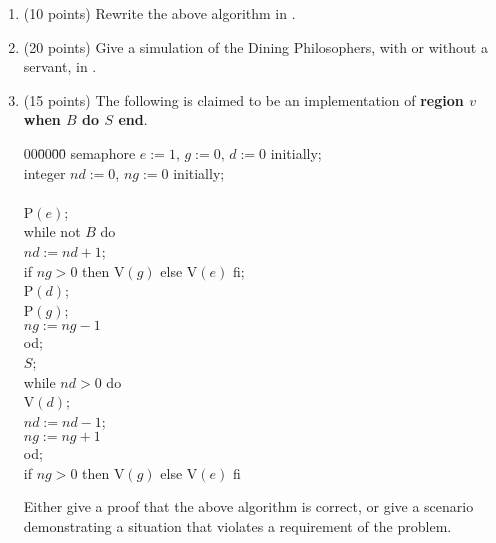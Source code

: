 \begin{enumerate}
\item (10 points)  Rewrite the above algorithm in \CSP.

\item (20 points)
Give a simulation of the Dining Philosophers, with or without a
servant, in \SR.


\newpage
\item (15 points)
The following is claimed to be an implementation of {\bf region $v$
when $B$ do $S$ end}.

{\bf
\begin{tabbing}
00\=00\=00\=\kill
semaphore $e := 1$, $g := 0$, $d := 0$ initially;\\
integer $nd := 0$, $ng := 0$ initially;\\
\\
P$(e)$;\\
while not $B$ do\+\\
  $nd := nd + 1$;\\
  if $ng > 0$ then V$(g)$ else V$(e)$ fi;\\
  P$(d)$;\\
  P$(g)$;\\
  $ng := ng - 1$\-\\
od;\\
$S$;\\
while $nd > 0$ do\+\\
  V$(d)$;\\
  $nd := nd - 1$;\\
  $ng := ng + 1$\-\\
od;\\
if $ng > 0$ then V$(g)$ else V$(e)$ fi\\
\end{tabbing}
}

\noindent
Either give a proof that the above algorithm is correct, or give a
scenario demonstrating a situation that violates a requirement of
the problem.

\end{enumerate}

